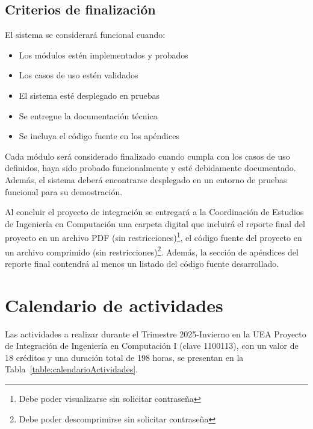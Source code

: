 \subsection*{Criterios de finalización}

El sistema se considerará funcional cuando:
\begin{itemize}
	\item Los módulos estén implementados y probados
	\item Los casos de uso estén validados
	\item El sistema esté desplegado en pruebas
	\item Se entregue la documentación técnica
	\item Se incluya el código fuente en los apéndices
\end{itemize}

	Cada módulo será considerado finalizado cuando cumpla con los casos de uso definidos, haya sido probado funcionalmente y esté debidamente documentado. Además, el sistema deberá encontrarse desplegado en un entorno de pruebas funcional para su demostración.
	
	\vspace{0.5cm}
	
	Al concluir el proyecto de integración se entregará a la Coordinación de Estudios de Ingeniería en Computación una carpeta digital que incluirá el reporte final del proyecto en un archivo PDF (sin restricciones)\footnote{Debe poder visualizarse sin solicitar contraseña}, el código fuente del proyecto en un archivo comprimido (sin restricciones)\footnote{Debe poder descomprimirse sin solicitar contraseña}. Además, la sección de apéndices del reporte final contendrá al menos un listado del código fuente desarrollado.


	\section{Calendario de actividades}

Las actividades a realizar durante el Trimestre 2025-Invierno en la UEA Proyecto de Integración de Ingeniería en Computación I (clave 1100113), con un valor de 18 créditos y una duración total de 198 horas, se presentan en la Tabla~\ref{table:calendarioActividades}.

